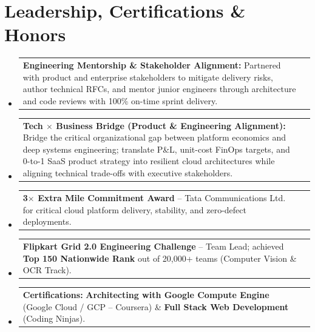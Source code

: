 \documentclass[letterpaper,9.5pt]{article}
\makeatletter
\newcommand{\resumeProjectHeading}[2]{
    \vspace{-2.5pt}\item
    \begin{tabular*}{1.0\textwidth}{l@{\extracolsep{\fill}}r}
      \small#1 & \small#2\\
    \end{tabular*}\vspace{-5pt}
}
\newcommand{\resumeSubHeadingListStart}{\begin{itemize}[leftmargin=0.0in, label={}]}
\newcommand{\resumeSubHeadingListEnd}{\end{itemize}}
\makeatother
\begin{document}
\section{Leadership, Certifications \& Honors}
  \resumeSubHeadingListStart
    \resumeProjectHeading
      {\textbf{Engineering Mentorship \& Stakeholder Alignment:} Partnered with product and enterprise stakeholders to mitigate delivery risks, author technical RFCs, and mentor junior engineers through architecture and code reviews with 100\% on-time sprint delivery.}{}
    \resumeProjectHeading
      {\textbf{Tech $\times$ Business Bridge (Product \& Engineering Alignment):} Bridge the critical organizational gap between platform economics and deep systems engineering; translate P\&L, unit-cost FinOps targets, and 0-to-1 SaaS product strategy into resilient cloud architectures while aligning technical trade-offs with executive stakeholders.}{}
    \resumeProjectHeading
      {\textbf{3$\times$ Extra Mile Commitment Award} -- Tata Communications Ltd. for critical cloud platform delivery, stability, and zero-defect deployments.}{}
    \resumeProjectHeading
      {\textbf{Flipkart Grid 2.0 Engineering Challenge} -- Team Lead; achieved \textbf{Top 150 Nationwide Rank} out of 20,000+ teams (Computer Vision \& OCR Track).}{}
    \resumeProjectHeading
      {\textbf{Certifications:} \textbf{Architecting with Google Compute Engine} (Google Cloud / GCP -- Coursera) \& \textbf{Full Stack Web Development} (Coding Ninjas).}{}
  \resumeSubHeadingListEnd
\end{document}
